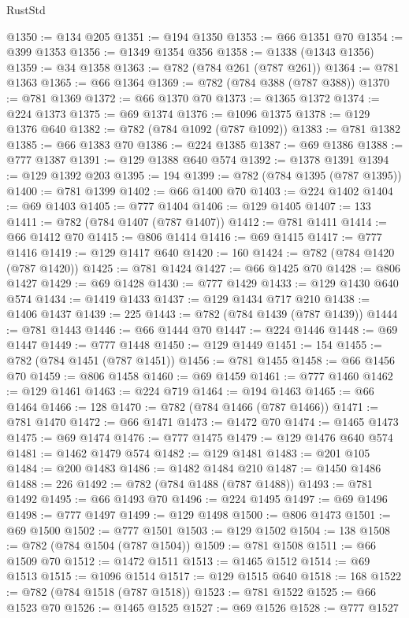 \begin{lexlean}{RustStd}
\begin{coremodule}
{\begin{coremodule}
{{{{{{{{{{{{{{{{{{{{{{{{{{{{{{{{{{{{{{{{{{{@1350 := @134 @205
@1351 := @194 @1350
@1353 := @66 @1351 @70
@1354 := @399 @1353
@1356 := @1349 @1354 @356
@1358 := @1338 (@1343 @1356)
@1359 := @34 @1358
@1363 := @782 (@784 @261 (@787 @261))
@1364 := @781 @1363
@1365 := @66 @1364
@1369 := @782 (@784 @388 (@787 @388))
@1370 := @781 @1369
@1372 := @66 @1370 @70
@1373 := @1365 @1372
@1374 := @224 @1373
@1375 := @69 @1374
@1376 := @1096 @1375
@1378 := @129 @1376 @640
@1382 := @782 (@784 @1092 (@787 @1092))
@1383 := @781 @1382
@1385 := @66 @1383 @70
@1386 := @224 @1385
@1387 := @69 @1386
@1388 := @777 @1387
@1391 := @129 @1388 @640 @574
@1392 := @1378 @1391
@1394 := @129 @1392 @203
@1395 := 194
@1399 := @782 (@784 @1395 (@787 @1395))
@1400 := @781 @1399
@1402 := @66 @1400 @70
@1403 := @224 @1402
@1404 := @69 @1403
@1405 := @777 @1404
@1406 := @129 @1405
@1407 := 133
@1411 := @782 (@784 @1407 (@787 @1407))
@1412 := @781 @1411
@1414 := @66 @1412 @70
@1415 := @806 @1414
@1416 := @69 @1415
@1417 := @777 @1416
@1419 := @129 @1417 @640
@1420 := 160
@1424 := @782 (@784 @1420 (@787 @1420))
@1425 := @781 @1424
@1427 := @66 @1425 @70
@1428 := @806 @1427
@1429 := @69 @1428
@1430 := @777 @1429
@1433 := @129 @1430 @640 @574
@1434 := @1419 @1433
@1437 := @129 @1434 @717 @210
@1438 := @1406 @1437
@1439 := 225
@1443 := @782 (@784 @1439 (@787 @1439))
@1444 := @781 @1443
@1446 := @66 @1444 @70
@1447 := @224 @1446
@1448 := @69 @1447
@1449 := @777 @1448
@1450 := @129 @1449
@1451 := 154
@1455 := @782 (@784 @1451 (@787 @1451))
@1456 := @781 @1455
@1458 := @66 @1456 @70
@1459 := @806 @1458
@1460 := @69 @1459
@1461 := @777 @1460
@1462 := @129 @1461
@1463 := @224 @719
@1464 := @194 @1463
@1465 := @66 @1464
@1466 := 128
@1470 := @782 (@784 @1466 (@787 @1466))
@1471 := @781 @1470
@1472 := @66 @1471
@1473 := @1472 @70
@1474 := @1465 @1473
@1475 := @69 @1474
@1476 := @777 @1475
@1479 := @129 @1476 @640 @574
@1481 := @1462 @1479 @574
@1482 := @129 @1481
@1483 := @201 @105
@1484 := @200 @1483
@1486 := @1482 @1484 @210
@1487 := @1450 @1486
@1488 := 226
@1492 := @782 (@784 @1488 (@787 @1488))
@1493 := @781 @1492
@1495 := @66 @1493 @70
@1496 := @224 @1495
@1497 := @69 @1496
@1498 := @777 @1497
@1499 := @129 @1498
@1500 := @806 @1473
@1501 := @69 @1500
@1502 := @777 @1501
@1503 := @129 @1502
@1504 := 138
@1508 := @782 (@784 @1504 (@787 @1504))
@1509 := @781 @1508
@1511 := @66 @1509 @70
@1512 := @1472 @1511
@1513 := @1465 @1512
@1514 := @69 @1513
@1515 := @1096 @1514
@1517 := @129 @1515 @640
@1518 := 168
@1522 := @782 (@784 @1518 (@787 @1518))
@1523 := @781 @1522
@1525 := @66 @1523 @70
@1526 := @1465 @1525
@1527 := @69 @1526
@1528 := @777 @1527
}}}}}}}}}}}}}}}}}}}}}}}}}}}}}}}}}}}}}}}}}}}
\end{coremodule}}
\end{coremodule}
\end{lexlean}
